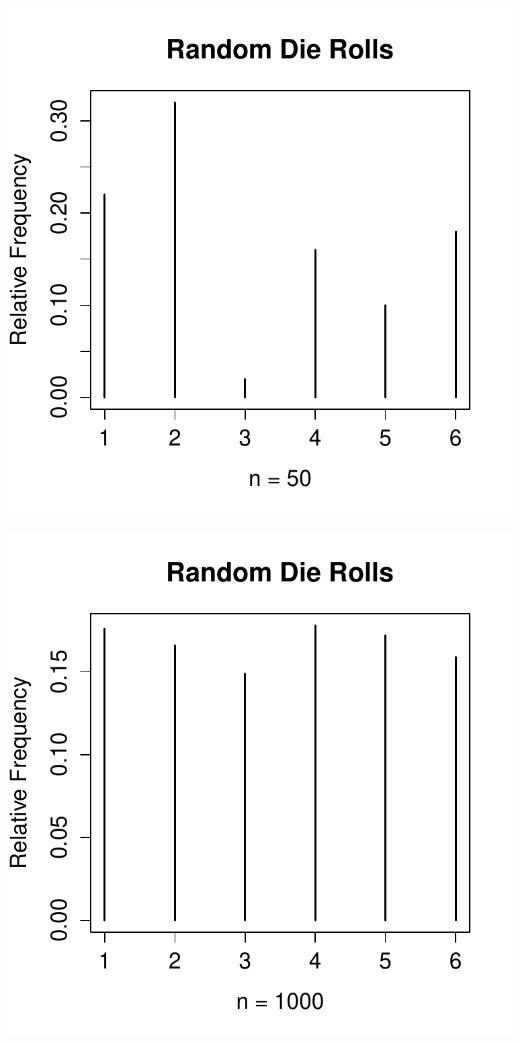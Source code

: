 \documentclass[handout]{beamer}
\begin{document}
\begin{frame}

\centering
\includegraphics[scale = 0.7]{./images/die2}

\end{frame}

\begin{frame}

\centering
\includegraphics[scale = 0.7]{./images/die3}

\end{frame}
\end{document}
